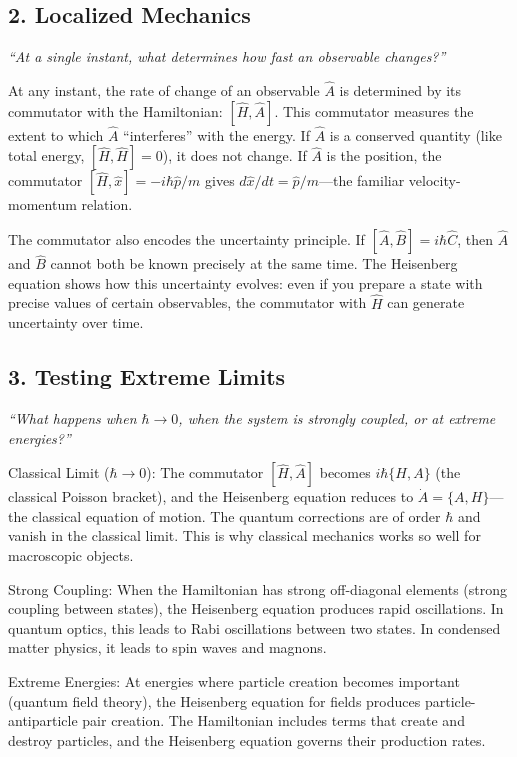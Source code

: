 \documentclass[11pt,openright]{book}
\begin{document}
\subsection*{2. Localized Mechanics}
\textit{``At a single instant, what determines how fast an observable changes?''}

At any instant, the rate of change of an observable $\hat{A}$ is determined by its commutator with the Hamiltonian: $[\hat{H}, \hat{A}]$. This commutator measures the extent to which $\hat{A}$ ``interferes'' with the energy. If $\hat{A}$ is a conserved quantity (like total energy, $[\hat{H}, \hat{H}] = 0$), it does not change. If $\hat{A}$ is the position, the commutator $[\hat{H}, \hat{x}] = -i\hbar\hat{p}/m$ gives $d\hat{x}/dt = \hat{p}/m$---the familiar velocity-momentum relation.

The commutator also encodes the uncertainty principle. If $[\hat{A}, \hat{B}] = i\hbar\hat{C}$, then $\hat{A}$ and $\hat{B}$ cannot both be known precisely at the same time. The Heisenberg equation shows how this uncertainty evolves: even if you prepare a state with precise values of certain observables, the commutator with $\hat{H}$ can generate uncertainty over time.

\subsection*{3. Testing Extreme Limits}
\textit{``What happens when $\hbar \to 0$, when the system is strongly coupled, or at extreme energies?''}

Classical Limit ($\hbar \to 0$): The commutator $[\hat{H}, \hat{A}]$ becomes $i\hbar\{H, A\}$ (the classical Poisson bracket), and the Heisenberg equation reduces to $\dot{A} = \{A, H\}$---the classical equation of motion. The quantum corrections are of order $\hbar$ and vanish in the classical limit. This is why classical mechanics works so well for macroscopic objects.

Strong Coupling: When the Hamiltonian has strong off-diagonal elements (strong coupling between states), the Heisenberg equation produces rapid oscillations. In quantum optics, this leads to Rabi oscillations between two states. In condensed matter physics, it leads to spin waves and magnons.

Extreme Energies: At energies where particle creation becomes important (quantum field theory), the Heisenberg equation for fields produces particle-antiparticle pair creation. The Hamiltonian includes terms that create and destroy particles, and the Heisenberg equation governs their production rates.
\end{document}
